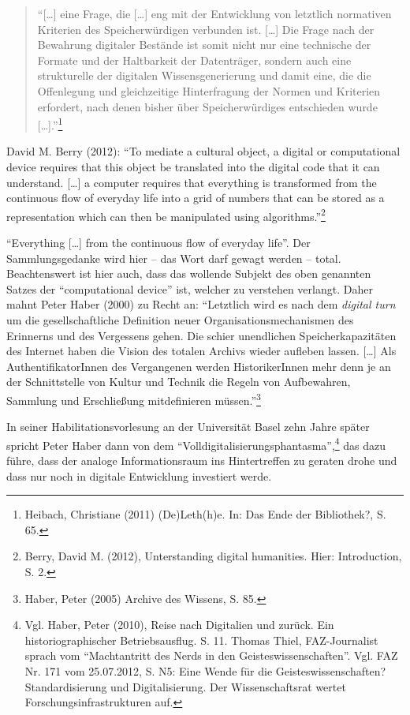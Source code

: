 \documentclass[a4paper,
fontsize=11pt,
oneside,
numbers=noperiodatend,
parskip=half-,
bibliography=totoc,
final
]{scrartcl}
\begin{document}
\begin{quote}
\enquote{{[}\ldots{}{]} eine Frage, die {[}\ldots{}{]} eng mit der
Entwicklung von letztlich normativen Kriterien des Speicherwürdigen
verbunden ist. {[}\ldots{}{]} Die Frage nach der Bewahrung digitaler
Bestände ist somit nicht nur eine technische der Formate und der
Haltbarkeit der Datenträger, sondern auch eine strukturelle der
digitalen Wissensgenerierung und damit eine, die die Offenlegung und
gleichzeitige Hinterfragung der Normen und Kriterien erfordert, nach
denen bisher über Speicherwürdiges entschieden wurde
{[}\ldots{}{]}.}\footnote{Heibach, Christiane (2011) (De)Leth(h)e. In:
  Das Ende der Bibliothek?, S. 65.}
\end{quote}

David M. Berry (2012): \enquote{To mediate a cultural object, a digital
or computational device requires that this object be translated into the
digital code that it can understand. {[}\ldots{}{]} a computer requires
that everything is transformed from the continuous flow of everyday life
into a grid of numbers that can be stored as a representation which can
then be manipulated using algorithms.}\footnote{Berry, David M. (2012),
  Unterstanding digital humanities. Hier: Introduction, S. 2.}

\enquote{Everything {[}\ldots{}{]} from the continuous flow of everyday
life}. Der Sammlungsgedanke wird hier -- das Wort darf gewagt werden --
total. Beachtenswert ist hier auch, dass das wollende Subjekt des oben
genannten Satzes der \enquote{computational device} ist, welcher zu
verstehen verlangt. Daher mahnt Peter Haber (2000) zu Recht an:
\enquote{Letztlich wird es nach dem \emph{digital turn} um die
gesellschaftliche Definition neuer Organisationsmechanismen des
Erinnerns und des Vergessens gehen. Die schier unendlichen
Speicherkapazitäten des Internet haben die Vision des totalen Archivs
wieder aufleben lassen. {[}\ldots{}{]} Als AuthentifikatorInnen des
Vergangenen werden HistorikerInnen mehr denn je an der Schnittstelle von
Kultur und Technik die Regeln von Aufbewahren, Sammlung und Erschließung
mitdefinieren müssen.}\footnote{Haber, Peter (2005) Archive des Wissens,
  S. 85.}

In seiner Habilitationsvorlesung an der Universität Basel zehn Jahre
später spricht Peter Haber dann von dem
\enquote{Volldigitalisierungsphantasma},\footnote{Vgl. Haber, Peter
  (2010), Reise nach Digitalien und zurück. Ein historiographischer
  Betriebsausflug. S. 11. Thomas Thiel, FAZ-Journalist sprach vom
  \enquote{Machtantritt des Nerds in den Geisteswissenschaften}. Vgl.
  FAZ Nr. 171 vom 25.07.2012, S. N5: Eine Wende für die
  Geisteswissenschaften? Standardisierung und Digitalisierung. Der
  Wissenschaftsrat wertet Forschungsinfrastrukturen auf.} das dazu
führe, dass der analoge Informationsraum ins Hintertreffen zu geraten
drohe und dass nur noch in digitale Entwicklung investiert werde.
\end{document}
